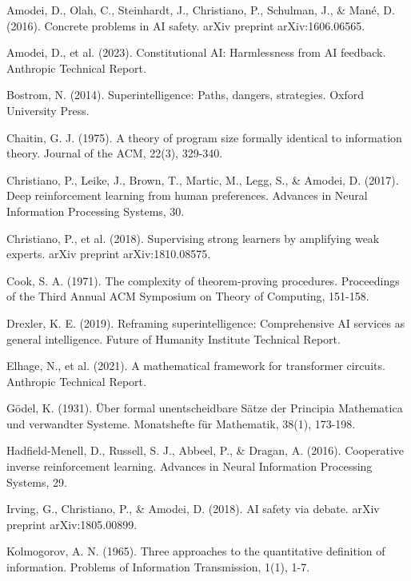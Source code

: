 \documentclass[11pt]{article}
\begin{document}

\begin{thebibliography}{99}
Amodei, D., Olah, C., Steinhardt, J., Christiano, P., Schulman, J., \& Mané, D. (2016). Concrete problems in AI safety. arXiv preprint arXiv:1606.06565.

Amodei, D., et al. (2023). Constitutional AI: Harmlessness from AI feedback. Anthropic Technical Report.

Bostrom, N. (2014). Superintelligence: Paths, dangers, strategies. Oxford University Press.

Chaitin, G. J. (1975). A theory of program size formally identical to information theory. Journal of the ACM, 22(3), 329-340.

Christiano, P., Leike, J., Brown, T., Martic, M., Legg, S., \& Amodei, D. (2017). Deep reinforcement learning from human preferences. Advances in Neural Information Processing Systems, 30.

Christiano, P., et al. (2018). Supervising strong learners by amplifying weak experts. arXiv preprint arXiv:1810.08575.

Cook, S. A. (1971). The complexity of theorem-proving procedures. Proceedings of the Third Annual ACM Symposium on Theory of Computing, 151-158.

Drexler, K. E. (2019). Reframing superintelligence: Comprehensive AI services as general intelligence. Future of Humanity Institute Technical Report.

Elhage, N., et al. (2021). A mathematical framework for transformer circuits. Anthropic Technical Report.

Gödel, K. (1931). Über formal unentscheidbare Sätze der Principia Mathematica und verwandter Systeme. Monatshefte für Mathematik, 38(1), 173-198.

Hadfield-Menell, D., Russell, S. J., Abbeel, P., \& Dragan, A. (2016). Cooperative inverse reinforcement learning. Advances in Neural Information Processing Systems, 29.

Irving, G., Christiano, P., \& Amodei, D. (2018). AI safety via debate. arXiv preprint arXiv:1805.00899.

Kolmogorov, A. N. (1965). Three approaches to the quantitative definition of information. Problems of Information Transmission, 1(1), 1-7.


\end{thebibliography}
\end{document}
